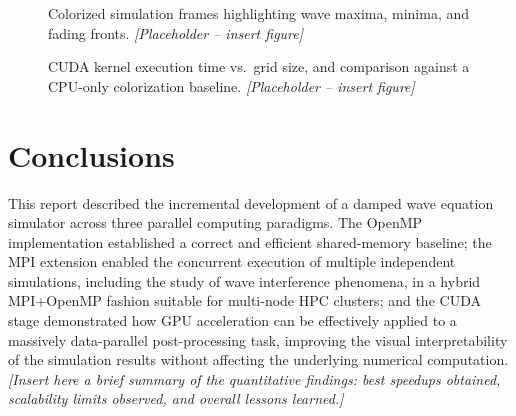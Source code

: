 \documentclass[10pt,twocolumn]{article}
\begin{document}
\begin{figure}[h]
\centering
\caption{Colorized simulation frames highlighting wave maxima, minima, and fading fronts. \textit{[Placeholder -- insert figure]}}
\label{fig:part3-frames}
\end{figure}

\begin{figure}[h]
\centering
\caption{CUDA kernel execution time vs.\ grid size, and comparison against a CPU-only colorization baseline. \textit{[Placeholder -- insert figure]}}
\label{fig:part3-perf}
\end{figure}

\section{Conclusions}
This report described the incremental development of a damped wave equation simulator across
three parallel computing paradigms. The OpenMP implementation established a correct and
efficient shared-memory baseline; the MPI extension enabled the concurrent execution of
multiple independent simulations, including the study of wave interference phenomena, in a
hybrid MPI+OpenMP fashion suitable for multi-node HPC clusters; and the CUDA stage demonstrated
how GPU acceleration can be effectively applied to a massively data-parallel post-processing
task, improving the visual interpretability of the simulation results without affecting the
underlying numerical computation. \textit{[Insert here a brief summary of the quantitative
findings: best speedups obtained, scalability limits observed, and overall lessons learned.]}

\end{document}
